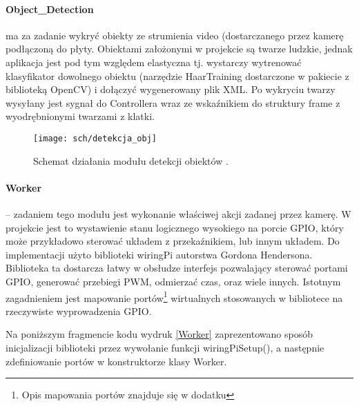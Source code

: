 \paragraph{Object\_Detection} ma za zadanie wykryć obiekty ze strumienia video (dostarczanego przez kamerę podłączoną do płyty. Obiektami założonymi w projekcie są twarze ludzkie, jednak aplikacja jest pod tym względem elastyczna tj. wystarczy wytrenować klasyfikator dowolnego obiektu (narzędzie HaarTraining dostarczone w pakiecie z biblioteką OpenCV) i dołączyć  wygenerowany plik XML. Po wykryciu twarzy wysyłany jest sygnał do Controllera wraz ze wskaźnikiem do struktury frame z wyodrębnionymi twarzami z klatki.

\begin{figure}[bth]
\centering
{\texttt{[image: sch/detekcja\_obj]}}
\caption[Schemat działania modułu detekcji obiektów.]{Schemat działania modułu detekcji obiektów .}
\label{fig:detObj}
\end{figure}

\paragraph{Worker} – zadaniem tego modułu jest wykonanie właściwej akcji zadanej przez kamerę. 
W projekcie jest to wystawienie stanu logicznego wysokiego na porcie GPIO, który może przykładowo sterować układem z przekaźnikiem, lub innym układem.
Do implementacji użyto biblioteki wiringPi autorstwa Gordona Hendersona. Biblioteka ta dostarcza łatwy w obsłudze interfejs pozwalający sterować portami GPIO, generować przebiegi PWM, odmierzać czas, oraz wiele innych.
Istotnym zagadnieniem jest mapowanie portów\footnote{Opis mapowania portów znajduje się w dodatku} wirtualnych stosowanych w bibliotece na rzeczywiste wyprowadzenia GPIO.

Na poniższym fragmencie kodu wydruk \ref{Worker} zaprezentowano sposób inicjalizacji biblioteki przez wywołanie funkcji wiringPiSetup(),  a następnie zdefiniowanie portów w konstruktorze klasy Worker.
